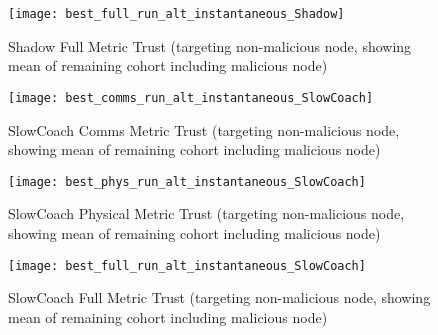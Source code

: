 \begin{figure}[h]
  \centering
  \texttt{[image: best\_full\_run\_alt\_instantaneous\_Shadow]}
  \caption{Shadow Full Metric Trust (targeting non-malicious node, showing mean of remaining cohort including malicious node)}
  \label{fig:full_alt_instantaneous_shadow}
\end{figure}



\begin{figure}[h]
  \centering
  \texttt{[image: best\_comms\_run\_alt\_instantaneous\_SlowCoach]}
  \caption{SlowCoach Comms Metric Trust (targeting non-malicious node, showing mean of remaining cohort including malicious node)}
  \label{fig:comms_alt_instantaneous_slowcoach}
\end{figure}

\begin{figure}[h]
  \centering
  \texttt{[image: best\_phys\_run\_alt\_instantaneous\_SlowCoach]}
  \caption{SlowCoach Physical Metric Trust (targeting non-malicious node, showing mean of remaining cohort including malicious node)}
  \label{fig:phys_alt_instantaneous_slowcoach}
\end{figure}

\begin{figure}[h]
  \centering
  \texttt{[image: best\_full\_run\_alt\_instantaneous\_SlowCoach]}
  \caption{SlowCoach Full Metric Trust (targeting non-malicious node, showing mean of remaining cohort including malicious node)}
  \label{fig:full_alt_instantaneous_slowcoach}
\end{figure}


